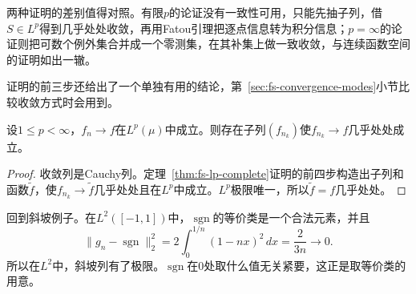 两种证明的差别值得对照。有限$p$的论证没有一致性可用，只能先抽子列，借$S\in L^p$得到几乎处处收敛，再用Fatou引理把逐点信息转为积分信息；$p=\infty$的论证则把可数个例外集合并成一个零测集，在其补集上做一致收敛，与连续函数空间的证明如出一辙。

证明的前三步还给出了一个单独有用的结论，第~\ref{sec:fs-convergence-modes}小节比较收敛方式时会用到。

\begin{theorem}[范数收敛的几乎处处收敛子列]
\label{thm:fs-ae-subsequence}
设$1\leq p<\infty$，$f_n\to f$在$L^p(\mu)$中成立。则存在子列$(f_{n_k})$使$f_{n_k}\to f$几乎处处成立。
\end{theorem}

\begin{proof}
收敛列是Cauchy列。定理~\ref{thm:fs-lp-complete}证明的前四步构造出子列和函数$\tilde f$，使$f_{n_k}\to\tilde f$几乎处处且在$L^p$中成立。$L^p$极限唯一，所以$\tilde f=f$几乎处处。
\end{proof}

回到斜坡例子。在$L^2([-1,1])$中，$\operatorname{sgn}$的等价类是一个合法元素，并且
\[
 \|g_n-\operatorname{sgn}\|_2^2=2\int_0^{1/n}(1-nx)^2\,dx=\frac{2}{3n}\to0 .
\]
所以在$L^2$中，斜坡列有了极限。$\operatorname{sgn}$在$0$处取什么值无关紧要，这正是取等价类的用意。

